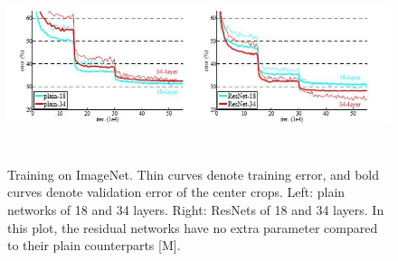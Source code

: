 \begin{figure}[H]
  \includegraphics[height=2.2in]{images/resnet-graph.jpg}
   \caption{Training on ImageNet. Thin curves denote training error, and bold curves denote validation error of the center crops. Left: plain networks of 18 and 34 layers. Right: ResNets of 18 and 34 layers. In this plot, the residual networks have no extra parameter compared to their plain counterparts [M].}
\end{figure}


